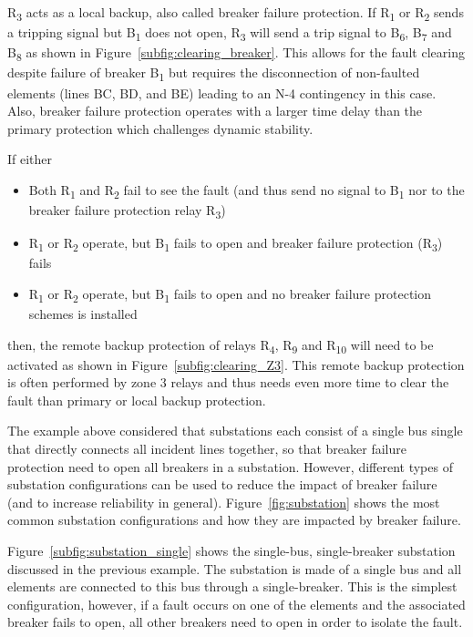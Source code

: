 R\textsubscript{3} acts as a local backup, also called breaker failure protection. If R\textsubscript{1} or R\textsubscript{2} sends a tripping signal but B\textsubscript{1} does not open, R\textsubscript{3} will send a trip signal to B\textsubscript{6}, B\textsubscript{7} and B\textsubscript{8} as shown in Figure~\ref{subfig:clearing_breaker}. This allows for the fault clearing despite failure of breaker B\textsubscript{1} but requires the disconnection of non-faulted elements (lines BC, BD, and BE) leading to an N-4 contingency in this case. Also, breaker failure protection operates with a larger time delay than the primary protection which challenges dynamic stability.

If either

\begin{itemize}
    \item Both R\textsubscript{1} and R\textsubscript{2} fail to see the fault (and thus send no signal to B\textsubscript{1} nor to the breaker failure protection relay R\textsubscript{3})
    \item R\textsubscript{1} or R\textsubscript{2} operate, but B\textsubscript{1} fails to open and breaker failure protection (R\textsubscript{3}) fails
    \item R\textsubscript{1} or R\textsubscript{2} operate, but B\textsubscript{1} fails to open and no breaker failure protection schemes is installed
\end{itemize}
\noindent then, the remote backup protection of relays R\textsubscript{4}, R\textsubscript{9} and R\textsubscript{10} will need to be activated as shown in Figure~\ref{subfig:clearing_Z3}. This remote backup protection is often performed by zone 3 relays and thus needs even more time to clear the fault than primary or local backup protection.

The example above considered that substations each consist of a single bus single that directly connects all incident lines together, so that breaker failure protection need to open all breakers in a substation. However, different types of substation configurations can be used to reduce the impact of breaker failure (and to increase reliability in general). Figure~\ref{fig:substation} shows the most common substation configurations and how they are impacted by breaker failure.

Figure~\ref{subfig:substation_single} shows the single-bus, single-breaker substation discussed in the previous example. The substation is made of a single bus and all elements are connected to this bus through a single-breaker. This is the simplest configuration, however, if a fault occurs on one of the elements and the associated breaker fails to open, all other breakers need to open in order to isolate the fault.

